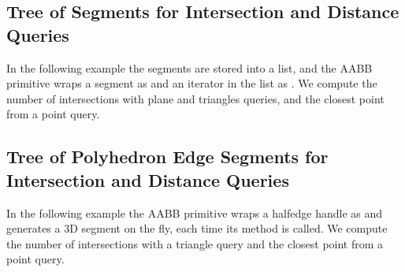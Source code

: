 \subsection{Tree of Segments for Intersection and Distance Queries}
In the following example the segments are stored into a list, and the AABB primitive wraps a segment as  and an iterator in the list as . We compute the number of intersections with plane and triangles queries, and the closest point from a point query. 

\subsection{Tree of Polyhedron Edge Segments for Intersection and Distance Queries}
In the following example the AABB primitive wraps a halfedge handle as  and generates a 3D segment on the fly, each time its method  is called. We compute the number of intersections with a triangle query and the closest point from a point query. 
